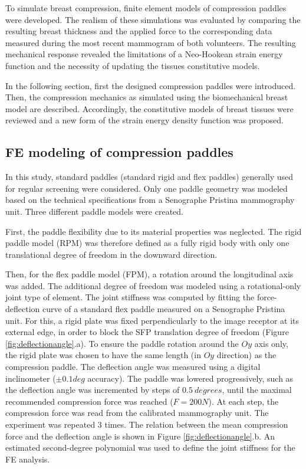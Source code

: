 To simulate breast compression, finite element models of compression paddles were developed. The realism of these simulations was evaluated by comparing the resulting breast thickness and the applied force to the corresponding data measured during the most recent mammogram of both volunteers. The resulting mechanical response revealed the limitations of a Neo-Hookean strain energy function and the necessity of updating  the tissues constitutive models. 

In the following section, first the designed compression paddles were introduced. Then, the compression mechanics as simulated using the biomechanical breast model are described. Accordingly,  the constitutive models of breast tissues were reviewed and a new form of the strain energy density function was proposed.  

\subsection{FE modeling of compression paddles}
In this study, standard paddles (standard rigid and flex paddles) generally used for regular screening were considered. Only one paddle geometry was modeled based on the technical specifications from a Senographe Pristina mammography unit. Three different paddle models were created.  

First, the paddle flexibility due to its material properties was neglected. The rigid paddle model (RPM) was therefore defined as a fully rigid body with only one translational degree of freedom in the downward direction. 

Then, for the flex paddle model (FPM), a rotation around the longitudinal axis was added. The additional degree of freedom was modeled using a rotational-only joint type of element. The joint stiffness was computed by fitting the force-deflection curve of a standard flex paddle measured on a Senographe Pristina unit. For this, a rigid plate was fixed perpendicularly to the image receptor at its external edge, in order to block the SFP translation degree of freedom (Figure \ref{fig:deflectionangle}.a). To ensure the paddle rotation around the $Oy$ axis only, the rigid plate was chosen to have the same length (in $Oy$ direction) as the compression paddle. The deflection angle was measured using a digital inclinometer ($\pm0.1deg$ accuracy). The paddle was lowered progressively, such as the deflection angle was incremented by steps of $0.5\ degrees$, until the maximal recommended compression force was reached ($F=200N$). At each step, the compression force was read from the calibrated mammography unit. The experiment was repeated 3 times. The relation between the mean compression force and the deflection angle is shown in Figure \ref{fig:deflectionangle}.b. An estimated second-degree polynomial was used to define the joint stiffness for the FE analysis.

